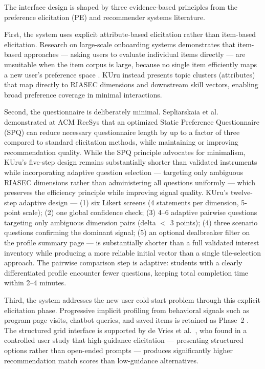 The interface design is shaped by three evidence-based principles from the preference elicitation (PE) and recommender systems literature.

First, the system uses explicit attribute-based elicitation rather than item-based elicitation. Research on large-scale onboarding systems demonstrates that item-based approaches --- asking users to evaluate individual items directly --- are unsuitable when the item corpus is large, because no single item efficiently maps a new user's preference space \cite{meshi2023preference}. KUru instead presents topic clusters (attributes) that map directly to RIASEC dimensions and downstream skill vectors, enabling broad preference coverage in minimal interactions.

Second, the questionnaire is deliberately minimal. Sepliarskaia et al.\ \cite{sepliarskaia2018preference} demonstrated at ACM RecSys that an optimized Static Preference Questionnaire (SPQ) can reduce necessary questionnaire length by up to a factor of three compared to standard elicitation methods, while maintaining or improving recommendation quality. While the SPQ principle advocates for minimalism, KUru's five-step design remains substantially shorter than validated instruments while incorporating adaptive question selection --- targeting only ambiguous RIASEC dimensions rather than administering all questions uniformly --- which preserves the efficiency principle while improving signal quality. KUru's twelve-step adaptive design --- (1) six Likert screens (4 statements per dimension, 5-point scale); (2) one global confidence check; (3) 4--6 adaptive pairwise questions targeting only ambiguous dimension pairs (delta $<$ 3 points); (4) three scenario questions confirming the dominant signal; (5) an optional dealbreaker filter on the profile summary page --- is substantially shorter than a full validated interest inventory while producing a more reliable initial vector than a single tile-selection approach. The pairwise comparison step is adaptive: students with a clearly differentiated profile encounter fewer questions, keeping total completion time within 2--4 minutes.

Third, the system addresses the new user cold-start problem \cite{bobadilla2014coldstart} through this explicit elicitation phase. Progressive implicit profiling from behavioral signals such as program page visits, chatbot queries, and saved items is retained as Phase~2 \cite{kanoje2015user, schilder2023global}. The structured grid interface is supported by de Vries et al.\ \cite{devries2024preference}, who found in a controlled user study that high-guidance elicitation --- presenting structured options rather than open-ended prompts --- produces significantly higher recommendation match scores than low-guidance alternatives.

